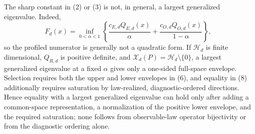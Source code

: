 The sharp constant in (2) or (3) is not, in general, a largest generalized eigenvalue.  Indeed,
\[
 F_d(x)=\inf_{0<\alpha<1}
 \left\{
 \frac{c_{E,d}Q_{E,d}(x)}{\alpha}
 +\frac{c_{O,d}Q_{O,d}(x)}{1-\alpha}
 \right\},
 \tag{9}
\]
so the profiled numerator is generally not a quadratic form.  If \(\mathcal H_d\) is finite dimensional, \(Q_{R,d}\) is positive definite, and \(\mathcal X_d(P)=\mathcal H_d\setminus\{0\}\), a largest generalized eigenvalue at a fixed \(\alpha\) gives only a one-sided full-space envelope.  Selection requires both the upper and lower envelopes in (6), and equality in (8) additionally requires saturation by law-realized, diagnostic-ordered directions.  Hence equality with a largest generalized eigenvalue can hold only after adding a common-space representation, a normalization of the positive lower envelope, and the required saturation; none follows from observable-law operator bijectivity or from the diagnostic ordering alone.